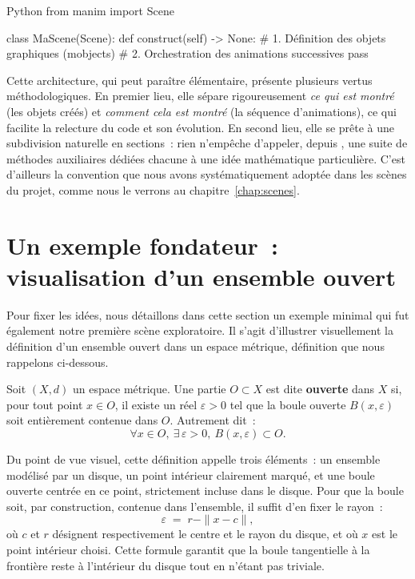 \documentclass[12pt, a4paper, openany]{report}
\begin{document}
	\begin{code}{Python}
from manim import Scene

class MaScene(Scene):
    def construct(self) -> None:
        # 1. Définition des objets graphiques (mobjects)
        # 2. Orchestration des animations successives
        pass
	\end{code}

	Cette architecture, qui peut paraître élémentaire, présente plusieurs vertus méthodologiques. En premier lieu, elle sépare rigoureusement \emph{ce qui est montré} (les objets créés) et \emph{comment cela est montré} (la séquence d’animations), ce qui facilite la relecture du code et son évolution. En second lieu, elle se prête à une subdivision naturelle en sections~: rien n’empêche d’appeler, depuis , une suite de méthodes auxiliaires dédiées chacune à une idée mathématique particulière. C’est d’ailleurs la convention que nous avons systématiquement adoptée dans les scènes du projet, comme nous le verrons au chapitre~\ref{chap:scenes}.

	\section{Un exemple fondateur~: visualisation d’un ensemble ouvert}

	Pour fixer les idées, nous détaillons dans cette section un exemple minimal qui fut également notre première scène exploratoire. Il s’agit d’illustrer visuellement la définition d’un ensemble ouvert dans un espace métrique, définition que nous rappelons ci-dessous.

	\begin{definition}
		Soit $(X,d)$ un espace métrique. Une partie $O\subset X$ est dite \textbf{ouverte} dans $X$ si, pour tout point $x\in O$, il existe un réel $\varepsilon>0$ tel que la boule ouverte $B(x,\varepsilon)$ soit entièrement contenue dans $O$. Autrement dit~:
		\[
			\forall x\in O,\ \exists\,\varepsilon>0,\ B(x,\varepsilon)\subset O.
		\]
	\end{definition}

	Du point de vue visuel, cette définition appelle trois éléments~: un ensemble modélisé par un disque, un point intérieur clairement marqué, et une boule ouverte centrée en ce point, strictement incluse dans le disque. Pour que la boule soit, par construction, contenue dans l’ensemble, il suffit d’en fixer le rayon~:
	\[
		\varepsilon \;=\; r - \|x-c\|,
	\]
	où $c$ et $r$ désignent respectivement le centre et le rayon du disque, et où $x$ est le point intérieur choisi. Cette formule garantit que la boule tangentielle à la frontière reste à l’intérieur du disque tout en n’étant pas triviale.
\end{document}

